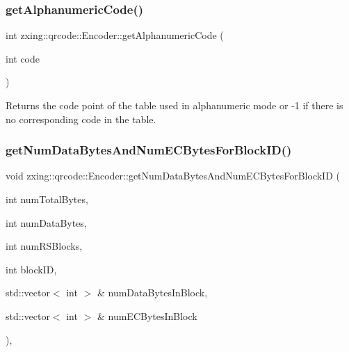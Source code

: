 \subsubsection{\texorpdfstring{get\+Alphanumeric\+Code()}{getAlphanumericCode()}}
{\footnotesize\ttfamily int zxing\+::qrcode\+::\+Encoder\+::get\+Alphanumeric\+Code (\begin{DoxyParamCaption}\item[{int}]{code }\end{DoxyParamCaption})\hspace{0.3cm}{\ttfamily [static]}}

\begin{DoxyReturn}{Returns}
the code point of the table used in alphanumeric mode or -\/1 if there is no corresponding code in the table. 
\end{DoxyReturn}
\mbox{\label{classzxing_1_1qrcode_1_1_encoder_a2ca7def3abfac0b589fb2192bb33598d}} 
\subsubsection{\texorpdfstring{get\+Num\+Data\+Bytes\+And\+Num\+E\+C\+Bytes\+For\+Block\+I\+D()}{getNumDataBytesAndNumECBytesForBlockID()}}
{\footnotesize\ttfamily void zxing\+::qrcode\+::\+Encoder\+::get\+Num\+Data\+Bytes\+And\+Num\+E\+C\+Bytes\+For\+Block\+ID (\begin{DoxyParamCaption}\item[{int}]{num\+Total\+Bytes,  }\item[{int}]{num\+Data\+Bytes,  }\item[{int}]{num\+R\+S\+Blocks,  }\item[{int}]{block\+ID,  }\item[{std\+::vector$<$ int $>$ \&}]{num\+Data\+Bytes\+In\+Block,  }\item[{std\+::vector$<$ int $>$ \&}]{num\+E\+C\+Bytes\+In\+Block }\end{DoxyParamCaption})\hspace{0.3cm}{\ttfamily [static]}, {\ttfamily [protected]}}

